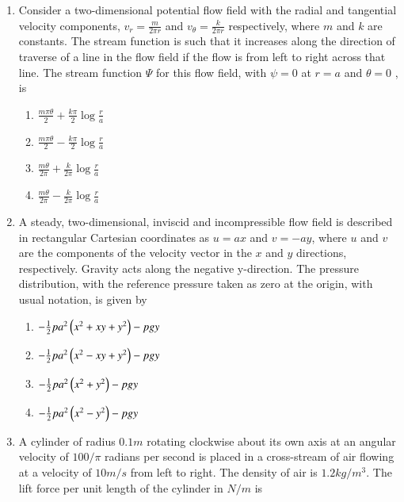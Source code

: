 \documentclass[journal]{IEEEtran}
\begin{document}
\begin{enumerate}[start=27]
    \item Consider a two-dimensional potential flow field with the radial and tangential velocity components, $v_{r} = \frac{m}{2\pi r}$ and $v_{\theta} = \frac{k}{2\pi r}$ respectively, where $m$ and $k$ are constants. The stream function is such that it increases along the direction of traverse of a line in the flow field if the flow is from left to right across that line. The stream function $\Psi$ for this flow field, with $\psi = 0$ at  $r = a$ and $\theta = 0$ , is
    \begin{multicols}{2}
        \begin{enumerate}
            \item $\frac{m \pi \theta}{2} + \frac{k \pi}{2} \log{\frac{r}{a}}$
            \item $\frac{m \pi \theta}{2} - \frac{k \pi}{2} \log{\frac{r}{a}}$
            \item $\frac{m  \theta}{2\pi} + \frac{k }{2\pi} \log{\frac{r}{a}}$
            \item $\frac{m  \theta}{2\pi} - \frac{k }{2\pi} \log{\frac{r}{a}}$
        \end{enumerate}
        
    \end{multicols}

    \item A steady, two-dimensional, inviscid and incompressible flow field is described in rectangular Cartesian coordinates as $u = ax$ and $v=-ay$, where $u$ and $v$ are the components of the velocity vector in the $x$ and $y$ directions, respectively. Gravity acts along the negative y-direction. The pressure distribution, with the reference pressure taken as zero at the origin, with usual notation, is given by
    \begin{multicols}{2}
        \begin{enumerate}
            \item $-\frac{1}{2}p a^2 \left(x^2 +xy +y^2\right) - pgy$
            \item $-\frac{1}{2}p a^2 \left(x^2 -xy +y^2\right) - pgy$
            \item $-\frac{1}{2}p a^2 \left(x^2 +y^2\right) - pgy$
            \item $-\frac{1}{2}p a^2 \left(x^2 - y^2\right) - pgy$
        \end{enumerate}
    \end{multicols}

    
    \item A cylinder of radius $0.1 m$ rotating clockwise about its own axis at an angular velocity of $100/\pi$ radians per second is placed in a cross-stream of air flowing at a velocity of $10 m/s$ from left to right. The density of air is $1.2 kg/m^3$. The lift force per unit length of the cylinder in $N/m$ is
\end{enumerate}
\end{document}
